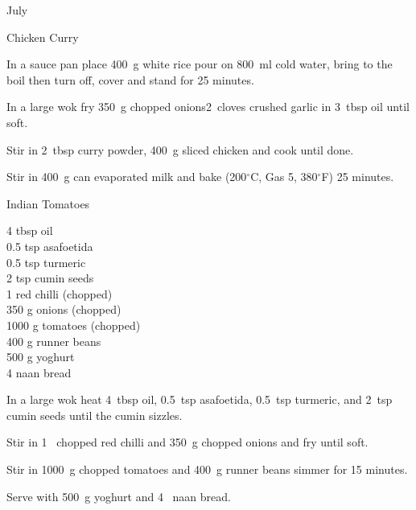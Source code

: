 \begin{menu}{July}
\begin{recipe}{2}{Chicken Curry}
\begin{ingredients}
		\end{ingredients}
	
	
    \begin{instructions}
    \item 
      In a
      sauce pan
      place
      400~g  white rice
      pour on
      800~ml  cold water,
      bring to the boil then turn off, cover and stand for 25 minutes.
    \item 
        In a large wok fry
        350~g chopped onions2~cloves crushed garlic
        in
        3~tbsp  oil
        until soft.
      \item 
        Stir in
        2~tbsp  curry powder,
        400~g sliced chicken
        and cook until done.
      \item 
        Stir in
        400~g  can evaporated milk
        and
        bake (200$^{\circ}$C, Gas 5, 380$^{\circ}$F) 25 minutes.
      
    \end{instructions}
    \end{recipe}%
  
    \begin{recipe}{2}{Indian Tomatoes}%
		\begin{ingredients}
		4 tbsp oil  \\
	0.5 tsp asafoetida  \\
	0.5 tsp turmeric  \\
	2 tsp cumin seeds  \\
	1  red chilli (chopped) \\
	350 g onions (chopped) \\
	1000 g tomatoes (chopped) \\
	400 g runner beans  \\
	500 g yoghurt  \\
	4  naan bread  \\
	
		\end{ingredients}
	
	
    \begin{instructions}
    \item 
        In a large wok heat
        4~tbsp  oil,
        0.5~tsp  asafoetida,
        0.5~tsp  turmeric,
        and
        2~tsp  cumin seeds
        until
        the cumin sizzles.
      \item 
        Stir in
        1~ chopped red chilli
        and
        350~g chopped onions
        and
        fry until soft.
      \item 
        Stir in
        1000~g chopped tomatoes
        and
        400~g  runner beans
        simmer for 15 minutes.
      \item 
        Serve with
        500~g  yoghurt
        and
        4~  naan bread.
      

\end{instructions}
\end{recipe}
\end{menu}
